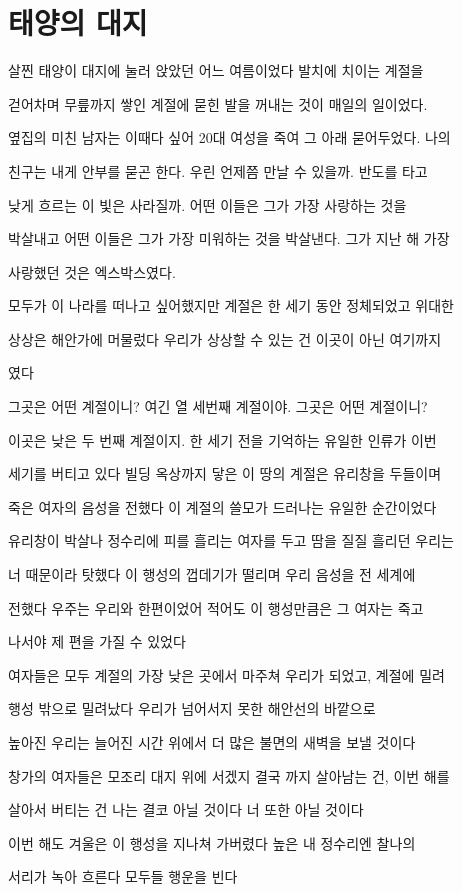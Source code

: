 \hypertarget{uxd0dcuxc591uxc758-uxb300uxc9c0}{%

\section{태양의 대지}\label{uxd0dcuxc591uxc758-uxb300uxc9c0}}



살찐 태양이 대지에 눌러 앉았던 어느 여름이었다 발치에 치이는 계절을

걷어차며 무릎까지 쌓인 계절에 묻힌 발을 꺼내는 것이 매일의 일이었다.

옆집의 미친 남자는 이때다 싶어 20대 여성을 죽여 그 아래 묻어두었다. 나의

친구는 내게 안부를 묻곤 한다. 우린 언제쯤 만날 수 있을까. 반도를 타고

낮게 흐르는 이 빛은 사라질까. 어떤 이들은 그가 가장 사랑하는 것을

박살내고 어떤 이들은 그가 가장 미워하는 것을 박살낸다. 그가 지난 해 가장

사랑했던 것은 엑스박스였다.



모두가 이 나라를 떠나고 싶어했지만 계절은 한 세기 동안 정체되었고 위대한

상상은 해안가에 머물렀다 우리가 상상할 수 있는 건 이곳이 아닌 여기까지

였다



그곳은 어떤 계절이니? 여긴 열 세번째 계절이야. 그곳은 어떤 계절이니?

이곳은 낮은 두 번째 계절이지. 한 세기 전을 기억하는 유일한 인류가 이번

세기를 버티고 있다 빌딩 옥상까지 닿은 이 땅의 계절은 유리창을 두들이며

죽은 여자의 음성을 전했다 이 계절의 쓸모가 드러나는 유일한 순간이었다

유리창이 박살나 정수리에 피를 흘리는 여자를 두고 땀을 질질 흘리던 우리는

너 때문이라 탓했다 이 행성의 껍데기가 떨리며 우리 음성을 전 세계에

전했다 우주는 우리와 한편이었어 적어도 이 행성만큼은 그 여자는 죽고

나서야 제 편을 가질 수 있었다



여자들은 모두 계절의 가장 낮은 곳에서 마주쳐 우리가 되었고, 계절에 밀려

행성 밖으로 밀려났다 우리가 넘어서지 못한 해안선의 바깥으로



높아진 우리는 늘어진 시간 위에서 더 많은 불면의 새벽을 보낼 것이다

창가의 여자들은 모조리 대지 위에 서겠지 결국 까지 살아남는 건, 이번 해를

살아서 버티는 건 나는 결코 아닐 것이다 너 또한 아닐 것이다



이번 해도 겨울은 이 행성을 지나쳐 가버렸다 높은 내 정수리엔 찰나의

서리가 녹아 흐른다 모두들 행운을 빈다

